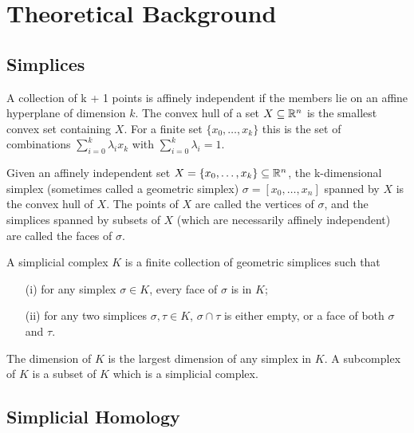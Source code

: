 \section{Theoretical Background}


\subsection{Simplices}

A collection of k + 1 points is affinely independent if the members lie on an affine hyperplane of dimension $k$. The convex hull of a set $X \subseteq \mathbb{R}^n$ is the smallest convex set containing $X$. For a finite set $\{x_0, \ldots, x_k\}$ this is the set of combinations $\sum_{i=0}^k \lambda_i x_k$ with $\sum_{i=0}^k\lambda_i = 1$.

\begin{definition}
    Given an affinely independent set $X = \{x_0, \ldots, x_k\} \subseteq \mathbb{R}^n$, the k-dimensional simplex (sometimes called a geometric simplex) $\sigma = [x_0, \ldots, x_n]$ spanned by $X$ is the convex hull of $X$. The points of $X$ are called the vertices of $\sigma$, and the simplices spanned by subsets of $X$ (which are necessarily affinely independent) are called the faces of $\sigma$.
\end{definition}

\begin{definition}
    A simplicial complex $K$ is a finite collection of geometric simplices such that
    \begin{itemize}
        \item[(i)] for any simplex $\sigma \in K$, every face of $\sigma$ is in $K$;
        \item[(ii)] for any two simplices $\sigma, \tau \in K$, $\sigma \cap \tau$ is either empty, or a face of both $\sigma$ and $\tau$.
    \end{itemize}
\end{definition}

The dimension of $K$ is the largest dimension of any simplex in $K$. A subcomplex of $K$ is a subset of $K$ which is a simplicial complex.


\subsection{Simplicial Homology}

